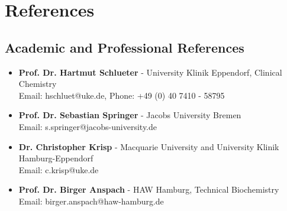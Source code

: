 \documentclass[11pt,a4paper]{article}
\begin{document}
\section{References}

\subsection{Academic and Professional References}
\begin{itemize}[leftmargin=*,itemsep=0.1em]
\item \textbf{Prof. Dr. Hartmut Schlueter} - University Klinik Eppendorf, Clinical Chemistry\\
Email: hschluet@uke.de, Phone: +49 (0) 40 7410 - 58795
\item \textbf{Prof. Dr. Sebastian Springer} - Jacobs University Bremen\\
Email: s.springer@jacobs-university.de  
\item \textbf{Dr. Christopher Krisp} - Macquarie University and University Klinik Hamburg-Eppendorf\\
Email: c.krisp@uke.de
\item \textbf{Prof. Dr. Birger Anspach} - HAW Hamburg, Technical Biochemistry\\
Email: birger.anspach@haw-hamburg.de
\end{itemize}
\end{document}
